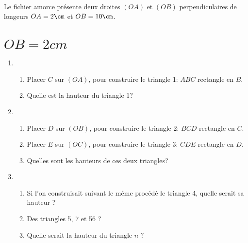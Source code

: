 \def\theme{Activités géométriques : Hauteurs et Triangles}
\def\date{04/11/2023}

\vspace*{0.5cm}

\newcommand*{\tri}[4]{
    \item Placer $#4$ sur $(O#2)$, pour construire le triangle #1: $#2#3#4$ rectangle en $#3$.
}

Le fichier amorce présente deux droites $(OA)$ et $(OB)$ perpendiculaires de longeurs $OA=2\cm$ et $OB=10\cm$.

\section{$OB = 2cm$}
\begin{enumerate}\setlength{\itemsep}{15pt}%
    \item \begin{enumerate}
        \tri{1}{A}{B}{C}
        \item Quelle est la hauteur du triangle 1?
    \end{enumerate}
    \item \begin{enumerate}
        \tri{2}{B}{C}{D}
        \tri{3}{C}{D}{E}
        \item Quelles sont les hauteurs de ces deux triangles?
        
    \end{enumerate}
    \item \begin{enumerate}
        \item Si l'on construisait suivant le même procédé le triangle 4,
        quelle serait sa hauteur ? 
        \item Des triangles 5, 7 et 56 ?
        \item Quelle serait la hauteur du triangle $n$ ?
    \end{enumerate}
\end{enumerate}

